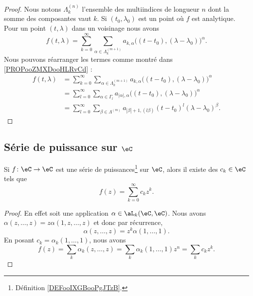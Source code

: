 \begin{proof}
	Nous notons \( \Lambda_k^{(n)}\) l'ensemble des multiindices de longueur \( n\) dont la somme des composantes vaut \( k\).
	Si \( (t_0,\lambda_0)\) est un point où \( f\) est analytique. Pour un point \( (t,\lambda)\) dans un voisinage nous avons
	\begin{equation}
		f(t,\lambda)=\sum_{k=0}^{\infty}\sum_{\alpha\in\Lambda_k^{(m+1)}}a_{k,\alpha}\big( (t-t_0),(\lambda-\lambda_0) \big)^{\alpha}.
	\end{equation}
	Nous pouvons réarranger les termes comme montré dans \ref{PROPooZMXDooHLRvCd} :
	\begin{subequations}
		\begin{align}
			f(t,\lambda) & =\sum_{k=0}^{\infty}\sum_{\alpha\in\Lambda_k^{(m+1)}}a_{k,\alpha}\big( (t-t_0),(\lambda-\lambda_0) \big)^{\alpha}  \\
			             & =\sum_{l=0}^{\infty}\sum_{\alpha\in \Gamma_l}a_{| \alpha |,\alpha}\big( (t-t_0),(\lambda-\lambda_0) \big)^{\alpha} \\
			             & =\sum_{l=0}^{\infty}\sum_{\beta\in \Lambda^{(m)}}a_{| \beta |+1,(l\beta)}(t-t_0)^l(\lambda-\lambda_0)^{\beta}.
		\end{align}
	\end{subequations}
\end{proof}


\subsection{Série de puissance sur \( \eC\)}

\begin{proposition}	\label{PROPooBFGJooYVvYaw}
	Si \(f \colon \eC\to \eC  \) est une série de puissances\footnote{Définition \ref{DEFooIXGBooPgJTzB}.} sur \( \eC\), alors il existe des \( c_k\in \eC\) tels que
	\begin{equation}
		f(z)=\sum_{k=0}^{\infty}c_kz^k.
	\end{equation}
\end{proposition}

\begin{proof}
	En effet soit une application \( \alpha\in \aL_k(\eC,\eC)\). Nous avons \( \alpha(z,\ldots,z)=z\alpha(1,z,\ldots,z)\) et donc par récurrence,
	\begin{equation}
		\alpha(z,\ldots,z)=z^{k}\alpha(1,\ldots,1).
	\end{equation}
	En posant \( c_k=\alpha_k(1,\ldots,1)\), nous avons
	\begin{equation}
		f(z)=\sum_k\alpha_k(z,\ldots,z)=\sum_k\alpha_k(1,\ldots,1)z^n=\sum_kc_kz^k.
	\end{equation}
\end{proof}

